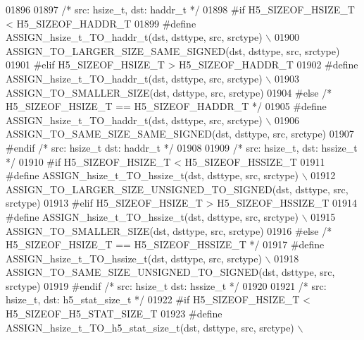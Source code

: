 \begin{DoxyCode}
01896 
01897 \textcolor{comment}{/* src: hsize\_t, dst: haddr\_t */}
01898 \textcolor{preprocessor}{#if H5\_SIZEOF\_HSIZE\_T < H5\_SIZEOF\_HADDR\_T}
01899 \textcolor{preprocessor}{    #define ASSIGN\_hsize\_t\_TO\_haddr\_t(dst, dsttype, src, srctype) \(\backslash\)}
01900 \textcolor{preprocessor}{        ASSIGN\_TO\_LARGER\_SIZE\_SAME\_SIGNED(dst, dsttype, src, srctype)}
01901 \textcolor{preprocessor}{#elif H5\_SIZEOF\_HSIZE\_T > H5\_SIZEOF\_HADDR\_T}
01902 \textcolor{preprocessor}{    #define ASSIGN\_hsize\_t\_TO\_haddr\_t(dst, dsttype, src, srctype) \(\backslash\)}
01903 \textcolor{preprocessor}{        ASSIGN\_TO\_SMALLER\_SIZE(dst, dsttype, src, srctype)}
01904 \textcolor{preprocessor}{#else }\textcolor{comment}{/* H5\_SIZEOF\_HSIZE\_T == H5\_SIZEOF\_HADDR\_T */}\textcolor{preprocessor}{}
01905 \textcolor{preprocessor}{    #define ASSIGN\_hsize\_t\_TO\_haddr\_t(dst, dsttype, src, srctype) \(\backslash\)}
01906 \textcolor{preprocessor}{        ASSIGN\_TO\_SAME\_SIZE\_SAME\_SIGNED(dst, dsttype, src, srctype)}
01907 \textcolor{preprocessor}{#endif }\textcolor{comment}{/* src: hsize\_t dst: haddr\_t */}\textcolor{preprocessor}{}
01908 
01909 \textcolor{comment}{/* src: hsize\_t, dst: hssize\_t */}
01910 \textcolor{preprocessor}{#if H5\_SIZEOF\_HSIZE\_T < H5\_SIZEOF\_HSSIZE\_T}
01911 \textcolor{preprocessor}{    #define ASSIGN\_hsize\_t\_TO\_hssize\_t(dst, dsttype, src, srctype) \(\backslash\)}
01912 \textcolor{preprocessor}{        ASSIGN\_TO\_LARGER\_SIZE\_UNSIGNED\_TO\_SIGNED(dst, dsttype, src, srctype)}
01913 \textcolor{preprocessor}{#elif H5\_SIZEOF\_HSIZE\_T > H5\_SIZEOF\_HSSIZE\_T}
01914 \textcolor{preprocessor}{    #define ASSIGN\_hsize\_t\_TO\_hssize\_t(dst, dsttype, src, srctype) \(\backslash\)}
01915 \textcolor{preprocessor}{        ASSIGN\_TO\_SMALLER\_SIZE(dst, dsttype, src, srctype)}
01916 \textcolor{preprocessor}{#else }\textcolor{comment}{/* H5\_SIZEOF\_HSIZE\_T == H5\_SIZEOF\_HSSIZE\_T */}\textcolor{preprocessor}{}
01917 \textcolor{preprocessor}{    #define ASSIGN\_hsize\_t\_TO\_hssize\_t(dst, dsttype, src, srctype) \(\backslash\)}
01918 \textcolor{preprocessor}{        ASSIGN\_TO\_SAME\_SIZE\_UNSIGNED\_TO\_SIGNED(dst, dsttype, src, srctype)}
01919 \textcolor{preprocessor}{#endif }\textcolor{comment}{/* src: hsize\_t dst: hssize\_t */}\textcolor{preprocessor}{}
01920 
01921 \textcolor{comment}{/* src: hsize\_t, dst: h5\_stat\_size\_t */}
01922 \textcolor{preprocessor}{#if H5\_SIZEOF\_HSIZE\_T < H5\_SIZEOF\_H5\_STAT\_SIZE\_T}
01923 \textcolor{preprocessor}{    #define ASSIGN\_hsize\_t\_TO\_h5\_stat\_size\_t(dst, dsttype, src, srctype) \(\backslash\)}

\end{DoxyCode}
